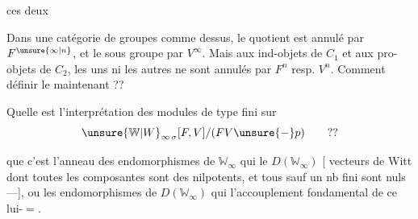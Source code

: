 
 ces deux 

Dans une catégorie de groupes comme dessus, le quotient est  annulé par $F^{\unsure{\infty|n}}$, et le sous groupe par $V^\infty$. Mais  aux ind-objets de $C_1$ et aux pro-objets de $C_2$, les uns ni les autres ne sont annulés par $F^n$ resp. $V^n$. Comment définir le  maintenant ??

Quelle est l'interprétation des modules de type fini sur
\[\unsure{\mathbb W|W}_{\infty\,\sigma}[F,V]/(FV\unsure{-}p)\qquad ??\]

 que c'est l'anneau des endomorphismes de $\mathbb W_\infty$ qui  le  $D(\mathbb W_\infty)$ [ vecteurs de Witt dont toutes les composantes sont des nilpotents, et tous sauf un nb fini sont nuls ---], ou les endomorphismes de $D(\mathbb W_\infty)$ qui  l'accouplement fondamental de ce   lui-$=$.
